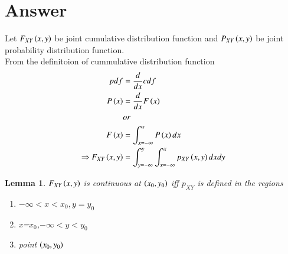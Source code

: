 \documentclass[journal,12pt,twocolumn]{IEEEtran}
\newtheorem{lemma}[theorem]{Lemma}
\begin{document}
\section{Answer}
Let $F_{XY}\left(x,y\right)$ be joint cumulative distribution function and $P_{XY}\left(x,y\right)$ be joint probability distribution function.\\
From the definitoion of cummulative distribution function 
\begin{align}
pdf &= \frac{d}{dx} cdf \nonumber \\
P\left(x\right) &= \frac{d}{dx} F\left(x\right)\nonumber\\
&or\nonumber\\
F\left(x\right) &= \int_{x=-\infty}^x P\left(x\right)dx\\
\Rightarrow F_{XY}\left(x,y\right) &= \int_{y=-\infty}^y \int_{x=-\infty}^x p_{XY}\left(x,y\right)dxdy
\end{align}
\begin{lemma}
$F_{XY}\left(x,y\right)$ is continuous at $\left(x_0,y_0\right)$ iff $p_{XY}$ is defined in the regions
\begin{enumerate}
\item $-\infty<x<x_0,y=y_0$  
\item x=$x_0$,$-\infty<y<y_0$ 
\item point $\left(x_0,y_0\right)$ 
\end{enumerate}
\end{lemma}
\end{document}

